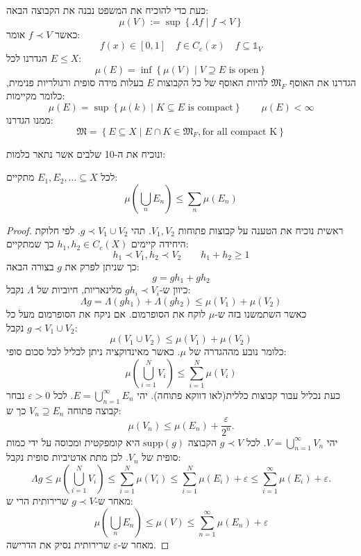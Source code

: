 \documentclass{tstextbook}
\begin{document}
כעת כדי להוכיח את המשפט נבנה את הקבוצה הבאה:
$$\mu(V):= \sup \left\{  \Lambda f\mid f\prec V  \right\}$$
כאשר \(f\prec V\)  אומר:
$$f(x) \in [0,1]\quad f \in C_{c}(x)\quad f \subseteq \mathbb{1} _{V}$$
הגדרנו לכל \(E \leq X\):
$$\mu(E)=\inf \left\{   \mu(V)\mid V\supseteq E \text{ is open}    \right\}$$
הגדרנו את האוסף \(\mathfrak{M}_{F}\) להיות האוסף של כל הקבוצות \(E\) בעלות מידה סופית ורגולריות פנימית, כלומר מקיימות:
$$\mu(E)=\sup \left\{  \mu(k)\mid K \subseteq E \text{ is compact}  \right\}\qquad \mu(E)<\infty$$
ממנו הגדרנו:
$$\mathfrak{M} =\left\{  E\subseteq X \mid E\cap K \in \mathfrak{M} _{F}, \text{for all compact K}  \right\}$$

ונוכיח את ה-10 שלבים אשר נתאר כלמות:

\begin{lemma}[שלב 1]
לכל \(E_{1},E_{2},\dots \subseteq X\) מתקיים:
$$\mu\left( \bigcup_{n}E_{n} \right)\leq \sum_{n}\mu(E_{n})$$

\end{lemma}
\begin{proof}
ראשית נוכיח את הטענה על קבוצות פתוחות \(V_{1},V_{2}\). תהי \(g\prec V_{1} \cup V_{2}\). לפי חלוקת היחידה קיימים \(h_{1},h_{2} \in C_{c}(X)\) כך שמתקיים:
$$h_{1}\prec V_{1},h_{2}\prec V_{2}\qquad h_{1}+h_{2}\geq 1$$
כך שניתן לפרק את \(g\) בצורה הבאה:
$$g=gh_{1}+gh_{2}$$
כיוון ש-\(gh_{i}\prec V_{i}\) מלינאריות, חיוביות של \(\Lambda\) נקבל:
$$\Lambda g=\Lambda(g h_{1})+\Lambda(g h_{2})\leq\mu(V_{1})+\mu(V_{2})$$
כאשר השתמשנו בזה ש-\(\mu\) לוקח את הסופרמום. אם ניקח את הסופרמום מעל כל \(g\prec V_{1}\cup V_{2}\) נקבל:
$$\mu(V_{1}\cup V_{2})\leq\mu(V_{1})+\mu(V_{2})$$
כלומר נובע מההגדרה של \(\mu\). כאשר מאינדוקציה ניתן לכליל לכל סכום סופי:
$$\mu\left(\bigcup_{i=1}^{N}V_{i}\right)\leq\sum_{i=1}^{N}\mu(V_{i})$$
כעת נכליל עבור קבוצות כללית(לאו דווקא פתוחה). יהי \(E=\bigcup_{n=1}^{\infty}E_{n}\). לכל \(\varepsilon> 0\) נבחר קבוצה פתוחה \(V_{n}\supseteq E_{n}\) כך ש:
$$\mu(V_{n})\leq\mu(E_{n})+\frac{\varepsilon}{2^{n}}.$$
יהי \(V=\bigcup_{n=1}^{\infty}V_{n}\). לכל \(g\prec V\) הקבוצה \(\text{supp}(g)\) היא קומפקטית ומכוסה על ידי כמות סופית של \(V_{n}\). לכן מתת אדטיביות סופית נקבל:
$$\Lambda g\leq\mu\left(\bigcup_{i=1}^{N}V_{i}\right)\leq\sum_{i=1}^{N}\mu(V_{i})\leq\sum_{i=1}^{N}\mu(E_{i})+\varepsilon\leq\sum_{i=1}^{\infty}\mu(E_{i})+\varepsilon.$$
מאחר ש-\(g\prec V\) שרירותית הרי ש:
$$\mu\left( \bigcup_{n}E_{n} \right)\leq \mu(V)\leq \sum_{n=1}^{\infty} \mu(E_{n})+\varepsilon $$
מאחר ש-\(\varepsilon\) שרירותית נסיק את הדרישה.

\end{proof}
\end{document}
